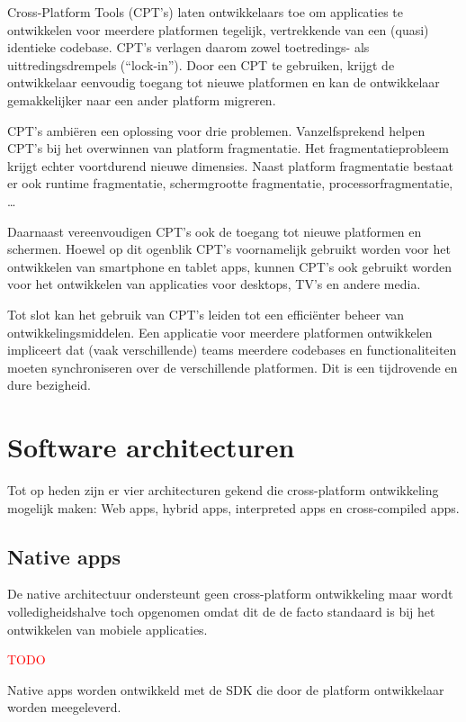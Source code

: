 \documentclass[a4paper,conference]{IEEEconf}
\newcommand{\TODO}{\textcolor{red}{TODO}}
\begin{document}
Cross-Platform Tools (CPT's) laten ontwikkelaars toe om applicaties te ontwikkelen voor meerdere platformen tegelijk, vertrekkende van een (quasi) identieke codebase. CPT's verlagen daarom zowel toetredings- als uittredingsdrempels (``lock-in''). Door een CPT te gebruiken, krijgt de ontwikkelaar eenvoudig toegang tot nieuwe platformen en kan de ontwikkelaar gemakkelijker naar een ander platform migreren. \cite{VM_CPT:2012}

CPT's ambiëren een oplossing voor drie problemen. Vanzelfsprekend helpen CPT's bij het overwinnen van platform fragmentatie. Het fragmentatieprobleem krijgt echter voortdurend nieuwe dimensies. Naast platform fragmentatie bestaat er ook runtime fragmentatie, schermgrootte fragmentatie, processorfragmentatie, \ldots 

Daarnaast vereenvoudigen CPT's ook de toegang tot nieuwe platformen en schermen. Hoewel op dit ogenblik CPT's voornamelijk gebruikt worden voor het ontwikkelen van smartphone en tablet apps, kunnen CPT's ook gebruikt worden voor het ontwikkelen van applicaties voor desktops, TV's en andere media.

Tot slot kan het gebruik van CPT's leiden tot een efficiënter beheer van ontwikkelingsmiddelen. Een applicatie voor meerdere platformen ontwikkelen impliceert dat (vaak verschillende) teams meerdere codebases en functionaliteiten moeten synchroniseren over de verschillende platformen. Dit is een tijdrovende en dure bezigheid.

\section{Software architecturen}

Tot op heden zijn er vier architecturen gekend die cross-platform ontwikkeling mogelijk maken: Web apps, hybrid apps, interpreted apps en cross-compiled apps.

\subsection{Native apps}

De native architectuur ondersteunt geen cross-platform ontwikkeling maar wordt volledigheidshalve toch opgenomen omdat dit de de facto standaard is bij het ontwikkelen van mobiele applicaties.

\TODO

Native apps worden ontwikkeld met de SDK die door de platform ontwikkelaar worden meegeleverd. 
\end{document}
